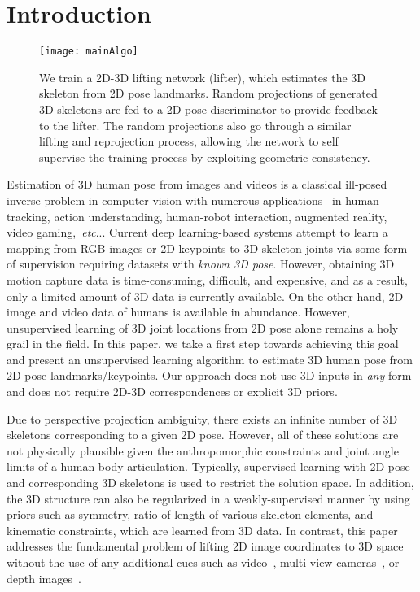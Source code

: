 \documentclass[10pt,twocolumn,letterpaper]{article}
\makeatletter
\DeclareRobustCommand\onedot{\futurelet\@let@token\@onedot}
\def\@onedot{\ifx\@let@token.\else.\null\fi\xspace}
\def\etc{\emph{etc}\onedot} \def\vs{\emph{vs}\onedot}
\makeatother
\begin{document}
 \section{Introduction}
\label{sect:introduction}
\begin{figure*}[htb]
	\centering
\texttt{[image: mainAlgo]}
	\caption{We train a 2D-3D lifting network (lifter), which estimates the 3D skeleton from 2D pose landmarks. Random projections of generated 3D skeletons are fed to a 2D pose discriminator to provide feedback to the lifter. The random projections also go through a similar lifting and reprojection process, allowing the network to self supervise the training process by exploiting geometric consistency.}
\label{fig:mainarch}
	\vspace{-3ex}
\end{figure*}

Estimation of 3D human pose from images and videos is a classical ill-posed inverse problem in computer vision with numerous applications~\cite{forsyth2006computational,hogg1983model,moeslund2001survey,o1980model} in human tracking, action understanding, human-robot interaction, augmented reality, video gaming,~\etc. Current deep learning-based systems attempt to learn a mapping from RGB images or 2D keypoints to 3D skeleton joints via some form of supervision requiring datasets with \emph{known 3D pose}. However, obtaining 3D motion capture data is time-consuming, difficult, and expensive, and as a result, only a limited amount of 3D data is currently available. On the other hand, 2D image and video data of humans is available in abundance. However, unsupervised learning of 3D joint locations from 2D pose alone remains a holy grail in the field. In this paper, we take a first step towards achieving this goal and present an unsupervised learning algorithm to estimate 3D human pose from 2D pose landmarks/keypoints. Our approach does not use 3D inputs in \textit{any} form and does not require 2D-3D correspondences or explicit 3D priors.

Due to perspective projection ambiguity, there exists an infinite number of 3D skeletons corresponding to a given 2D pose. However, all of these solutions are not physically plausible given the anthropomorphic constraints and joint angle limits of a human body articulation. Typically, supervised learning with 2D pose and corresponding 3D skeletons is used to restrict the solution space. In addition, the 3D structure can also be regularized in a weakly-supervised manner by using priors such as symmetry, ratio of length of various skeleton elements, and kinematic constraints, which are learned from 3D data. In contrast, this paper addresses the fundamental problem of lifting 2D image coordinates to 3D space without the use of any additional cues such as video~\cite{tekin2016direct,Zhou_2016_CVPR}, multi-view cameras~\cite{amin2013multi,hofmann2012multi}, or depth images~\cite{rafi2015semantic,shotton2013real,yub2015random}.
\end{document}
